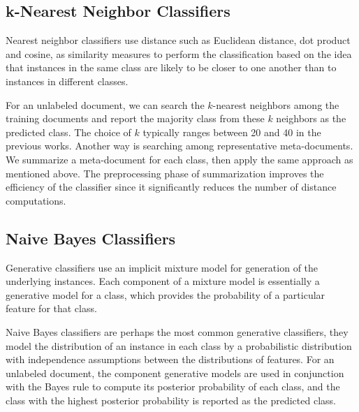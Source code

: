 \subsection{k-Nearest Neighbor Classifiers}
\par Nearest neighbor classifiers use distance such as Euclidean distance, dot product and cosine, as similarity measures to perform the classification based on the idea that instances in the same class are likely to be closer to one another than to instances in different classes.
\par For an unlabeled document, we can search the $k$-nearest neighbors among the training documents and report the majority class from these $k$ neighbors as the predicted class. The choice of $k$ typically ranges between 20 and 40 in the previous works\cite{yang1994knn,yang1999mlall,han2001knn}. Another way is searching among representative meta-documents. We summarize a meta-document for each class, then apply the same approach as mentioned above. The preprocessing phase of summarization improves the efficiency of the classifier since it significantly reduces the number of distance computations\cite{rocchio1971knn,han2000knn}.

\subsection{Naive Bayes Classifiers}
\par Generative classifiers use an implicit mixture model for generation of the underlying instances. Each component of a mixture model is essentially a generative model for a class, which provides the probability of a particular feature for that class.
\par Naive Bayes classifiers are perhaps the most common generative classifiers, they model the distribution of an instance in each class by a probabilistic distribution with independence assumptions between the distributions of features. For an unlabeled document, the component generative models are used in conjunction with the Bayes rule to compute its posterior probability of each class, and the class with the highest posterior probability is reported as the predicted class\cite{yang1999mlall,joachims1997nb,koller1997nb,lewis1998nb,mccallum1998nb,ng2002nblr}.

